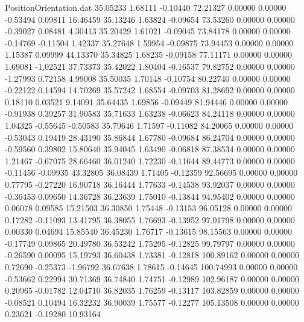 \begin{filecontents}{PositionOrientation.dat}
  35.05233    1.68111   -0.10440    72.21327    0.00000    0.00000   -0.53494    0.09811   16.46459
  35.13246    1.63824   -0.09654    73.53260    0.00000    0.00000   -0.39027    0.08481    4.30413
  35.20429    1.61021   -0.09045    73.84178    0.00000    0.00000   -0.14769   -0.11504    1.42337
  35.27648    1.59954   -0.09875    73.94453    0.00000    0.00000    1.15387    0.09999   44.13370
  35.34825    1.68235   -0.09158    77.11171    0.00000    0.00000    1.69081   -1.02521   37.73373
  35.42022    1.80404   -0.16537    79.82752    0.00000    0.00000   -1.27993    0.72158    4.99008
  35.50035    1.70148   -0.10754    80.22740    0.00000    0.00000   -0.22122    0.14594   14.70269
  35.57242    1.68554   -0.09703    81.28692    0.00000    0.00000    0.18110    0.03521    9.14091
  35.64435    1.69856   -0.09449    81.94446    0.00000    0.00000   -0.91938    0.39257   31.90583
  35.71633    1.63238   -0.06623    84.24118    0.00000    0.00000    1.04325   -0.55645   -0.50583
  35.79646    1.71597   -0.11082    84.20065    0.00000    0.00000   -0.53043    0.19419   28.43190
  35.86844    1.67780   -0.09684    86.24704    0.00000    0.00000   -0.59560    0.39802   15.80640
  35.94045    1.63490   -0.06818    87.38534    0.00000    0.00000    1.21467   -0.67075   28.66460
  36.01240    1.72230   -0.11644    89.44773    0.00000    0.00000   -0.11456   -0.09935   43.32805
  36.08439    1.71405   -0.12359    92.56695    0.00000    0.00000    0.77795   -0.27220   16.90718
  36.16444    1.77633   -0.14538    93.92037    0.00000    0.00000   -0.36453    0.09650   14.36728
  36.23639    1.75010   -0.13844    94.95402    0.00000    0.00000    0.06078    0.09585   15.21503
  36.30850    1.75448   -0.13153    96.05128    0.00000    0.00000    0.17282   -0.11093   13.41795
  36.38055    1.76693   -0.13952    97.01798    0.00000    0.00000    0.00330    0.04694   15.85540
  36.45230    1.76717   -0.13615    98.15563    0.00000    0.00000   -0.17749    0.09865   20.49780
  36.53242    1.75295   -0.12825    99.79797    0.00000    0.00000   -0.26590    0.00095   15.19793
  36.60438    1.73381   -0.12818   100.89162    0.00000    0.00000    0.72690   -0.25373   -1.96792
  36.67638    1.78615   -0.14645   100.74993    0.00000    0.00000   -0.53662    0.22994   30.71369
  36.74840    1.74751   -0.12989   102.96187    0.00000    0.00000    0.20965   -0.01782   12.04710
  36.82035    1.76259   -0.13117   103.82859    0.00000    0.00000   -0.08521    0.10494   16.32232
  36.90039    1.75577   -0.12277   105.13508    0.00000    0.00000    0.23621   -0.19280   10.93164

\end{filecontents}
